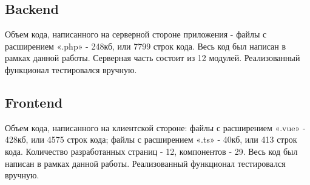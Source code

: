 \documentclass[../../Отчет.tex]{subfiles}
\begin{document}
\subsection{Backend}
\par
Объем кода, написанного на серверной стороне приложения - файлы с расширением «.php» - 248кб, или 7799 строк кода. Весь код был написан в рамках данной работы. Серверная часть состоит из 12 модулей. Реализованный функционал тестировался вручную.  
\subsection{Frontend}
\par
Объем кода, написанного на клиентской стороне: файлы с расширением «.vue» - 428кб, или 4575 строк кода; файлы с расширением «.ts» - 40кб, или 413 строк кода. Количество разработанных страниц - 12, компонентов - 29. Весь код был написан в рамках данной работы. Реализованный функционал тестировался вручную.
\end{document}
